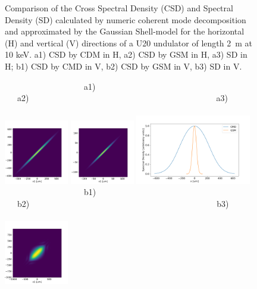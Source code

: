 \documentclass{iopconfser}
\begin{document}
\begin{figure}[H]
        
    \caption{Comparison of the Cross Spectral Density (CSD) and Spectral Density (SD) calculated by numeric coherent mode decomposition and approximated by the Gaussian Shell-model for the horizontal (H) and vertical (V) directions of a U20 undulator of length \SI{2}{\meter} at 10 keV.
    a1) CSD by CDM in H,
    a2) CSD by GSM in H,
    a3) SD in H;
    b1) CSD by CMD in V,
    b2) CSD by GSM in V,
    b3) SD in V.
    }
    \label{fig:GSMvsUND}
\end{figure}

\begin{figure}[H]
    \centering
    ~~~~~~~~~~~~~~~~~~~a1)~~~~~~~~~~~~~~~~~~~~~~~~~~~~~~~~~~~~~~~~~a2)~~~~~~~~~~~~~~~~~~~~~~~~~~~~~~~~~~~~~~~~~~~~~a3)~~~~~~~~~~~~~~~~~~~~~~~~~~~~~~~~~~~~~~~~~\\
    \includegraphics[width=0.25\textwidth]{figures/CMD_H-propagated.png}
    \includegraphics[width=0.25\textwidth]{figures/GSM_H-propagated.png}
    \includegraphics[width=0.45\textwidth]{figures/SD_H-propagated.png}\\
~~~~~~~~~~~~~~~~~~~b1)~~~~~~~~~~~~~~~~~~~~~~~~~~~~~~~~~~~~~~~~~b2)~~~~~~~~~~~~~~~~~~~~~~~~~~~~~~~~~~~~~~~~~~~~~b3)~~~~~~~~~~~~~~~~~~~~~~~~~~~~~~~~~~~~~~~~~\\
    \includegraphics[width=0.25\textwidth]{figures/CMD_V-propagated.png}

\end{figure}
\end{document}
